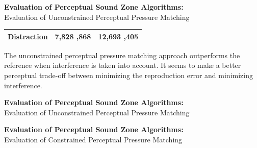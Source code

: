 \documentclass[aspectratio=169]{beamer}
\begin{document}
\begin{frame}{\textbf{Evaluation of Perceptual Sound Zone Algorithms:}\\ Evaluation of Unconstrained
    Perceptual Pressure Matching}
\begin{table}[]
\begin{tabular}{lS[round-mode=places]S[round-mode=places]}
        Distraction         & 7,828                  ,868              & 12,693  ,405                              \\ 
        \bottomrule
    \end{tabular}
    \end{table}
    The unconstrained perceptual pressure matching approach outperforms the reference when interference is taken into account.
    It seems to make a better perceptual trade-off between minimizing the reproduction error and minimizing interference.
\end{frame}

\begin{frame}{\textbf{Evaluation of Perceptual Sound Zone Algorithms:}\\ Evaluation of Unconstrained
    Perceptual Pressure Matching}
    \begin{figure}[]
        \centering
        \scalebox{0.55}{}
    \end{figure}
\end{frame}

\begin{frame}{\textbf{Evaluation of Perceptual Sound Zone Algorithms:}\\ Evaluation of Constrained
    Perceptual Pressure Matching}
\end{frame}
\end{document}
